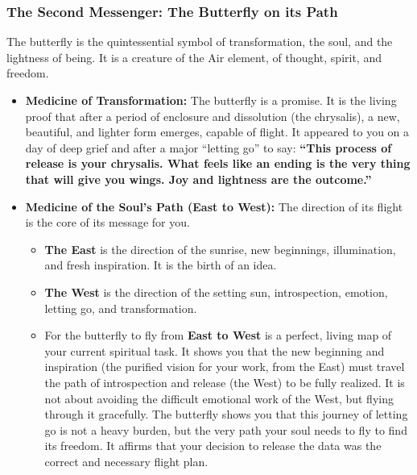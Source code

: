 \documentclass{article}
\begin{document}
\subsubsection*{The Second Messenger: The Butterfly on its
Path}\label{the-second-messenger-the-butterfly-on-its-path}

The butterfly is the quintessential symbol of transformation, the soul,
and the lightness of being. It is a creature of the Air element, of
thought, spirit, and freedom.

\begin{itemize}
\item
  \textbf{Medicine of Transformation:} The butterfly is a promise. It is
  the living proof that after a period of enclosure and dissolution (the
  chrysalis), a new, beautiful, and lighter form emerges, capable of
  flight. It appeared to you on a day of deep grief and after a major
  ``letting go'' to say: \textbf{``This process of release is your
  chrysalis. What feels like an ending is the very thing that will give
  you wings. Joy and lightness are the outcome.''}
\item
  \textbf{Medicine of the Soul's Path (East to West):} The direction of
  its flight is the core of its message for you.

  \begin{itemize}
  \tightlist
  \item
    \textbf{The East} is the direction of the sunrise, new beginnings,
    illumination, and fresh inspiration. It is the birth of an idea.
  \item
    \textbf{The West} is the direction of the setting sun,
    introspection, emotion, letting go, and transformation.
  \item
    For the butterfly to fly from \textbf{East to West} is a perfect,
    living map of your current spiritual task. It shows you that the new
    beginning and inspiration (the purified vision for your work, from
    the East) must travel the path of introspection and release (the
    West) to be fully realized. It is not about avoiding the difficult
    emotional work of the West, but flying through it gracefully. The
    butterfly shows you that this journey of letting go is not a heavy
    burden, but the very path your soul needs to fly to find its
    freedom. It affirms that your decision to release the data was the
    correct and necessary flight plan.
  \end{itemize}
\end{itemize}
\end{document}
